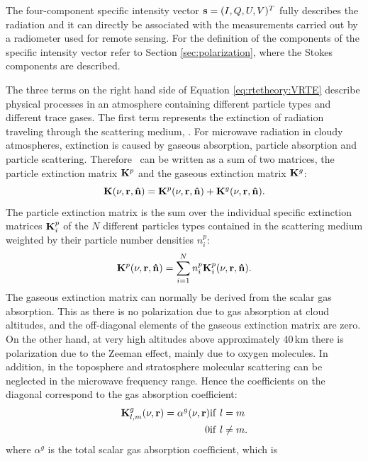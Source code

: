 The four-component specific intensity vector ${\bf s} = (I,Q,U,V)^T$
fully describes the radiation and it can directly be associated with
the measurements carried out by a radiometer used for remote sensing.
For the definition of the components of the specific intensity vector
refer to Section \ref{sec:polarization}, where the Stokes
components are described. 

The three terms on the right hand side of Equation \ref{eq:rtetheory:VRTE}
describe physical processes in an atmosphere containing different particle
types and different trace gases. The first term represents the extinction of
radiation traveling through the scattering medium, \ExtMat. For microwave
radiation in cloudy atmospheres, extinction is caused by gaseous absorption,
particle absorption and particle scattering. Therefore \ExtMat\ can be written
as a sum of two matrices, the particle extinction matrix ${\bf K}^{p}$ and the
gaseous extinction matrix ${\bf K}^{g}$:
\begin{equation}
  {\bf K}(\nu,{\bf r},{\bf \hat{n}}) = {\bf K}^{p}(\nu,{\bf r},{\bf \hat{n}})+
  {\bf K}^{g}(\nu,{\bf r},{\bf \hat{n}}).
\end{equation}
The particle extinction matrix is the sum over the individual specific
extinction matrices ${\bf K}_i^p$ of the $N$ different particles types
contained in the scattering medium weighted by their particle number densities
$n^p_i$:
\begin{equation}
  {\bf K}^{p}(\nu,{\bf r},{\bf \hat{n}}) =
  \sum_{i=1}^N n^p_i {\bf K}_i^p(\nu,{\bf r},{\bf \hat{n}}).
\label{eq:rtetheory:ext_mat_p}
\end{equation}
The gaseous extinction matrix can
normally be derived from the scalar gas absorption. This as there is no
polarization due to gas absorption at cloud altitudes, and the off-diagonal
elements of the gaseous extinction matrix are zero. On the other hand, at very
high altitudes above approximately 40\,km there is polarization due to the
Zeeman effect, mainly due to oxygen molecules. In addition, in the toposphere
and stratosphere molecular scattering can be neglected in the microwave
frequency range. Hence the coefficients on the diagonal correspond to the gas
absorption coefficient:
\begin{eqnarray}
{\bf K}^{g}_{l,m}(\nu,{\bf r}) = \alpha^g(\nu,{\bf r}) & 
    \mathrm{if }\ l = m \nonumber \\
    0 & \mathrm{if }\ l \neq m.
\label{eq:rtetheory:Kgas}
\end{eqnarray}
where $\alpha^g$ is the total scalar gas absorption coefficient, which is
